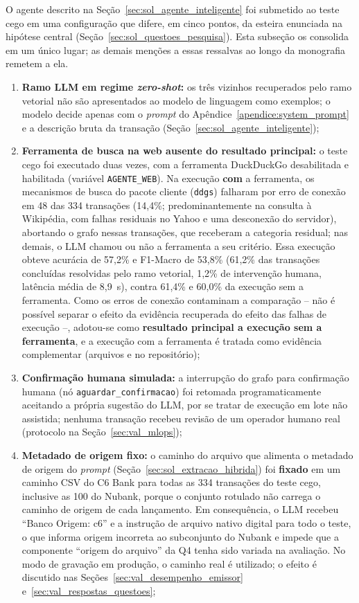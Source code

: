 O agente descrito na Seção~\ref{sec:sol_agente_inteligente} foi submetido ao teste cego em uma configuração que difere, em cinco pontos, da esteira enunciada na hipótese central (Seção~\ref{sec:sol_questoes_pesquisa}). Esta subseção os consolida em um único lugar; as demais menções a essas ressalvas ao longo da monografia remetem a ela.
\begin{enumerate}
	\item \textbf{Ramo LLM em regime \textit{zero-shot}:} os três vizinhos recuperados pelo ramo vetorial não são apresentados ao modelo de linguagem como exemplos; o modelo decide apenas com o \textit{prompt} do Apêndice~\ref{apendice:system_prompt} e a descrição bruta da transação (Seção~\ref{sec:sol_agente_inteligente});
	\item \textbf{Ferramenta de busca na web ausente do resultado principal:} o teste cego foi executado duas vezes, com a ferramenta DuckDuckGo desabilitada e habilitada (variável \texttt{AGENTE\_WEB}). Na execução \textbf{com} a ferramenta, os mecanismos de busca do pacote cliente (\texttt{ddgs}) falharam por erro de conexão em 48 das 334 transações (14,4\%; predominantemente na consulta à Wikipédia, com falhas residuais no Yahoo e uma desconexão do servidor), abortando o grafo nessas transações, que receberam a categoria residual; nas demais, o LLM chamou ou não a ferramenta a seu critério. Essa execução obteve acurácia de 57,2\% e F1-Macro de 53,8\% (61,2\% das transações concluídas resolvidas pelo ramo vetorial, 1,2\% de intervenção humana, latência média de 8,9~s), contra 61,4\% e 60,0\% da execução sem a ferramenta. Como os erros de conexão contaminam a comparação -- não é possível separar o efeito da evidência recuperada do efeito das falhas de execução --, adotou-se como \textbf{resultado principal a execução sem a ferramenta}, e a execução com a ferramenta é tratada como evidência complementar (arquivos  e  no repositório);
	\item \textbf{Confirmação humana simulada:} a interrupção do grafo para confirmação humana (nó \texttt{aguardar\_confirmacao}) foi retomada programaticamente aceitando a própria sugestão do LLM, por se tratar de execução em lote não assistida; nenhuma transação recebeu revisão de um operador humano real (protocolo na Seção~\ref{sec:val_mlops});
	\item \textbf{Metadado de origem fixo:} o caminho do arquivo que alimenta o metadado de origem do \textit{prompt} (Seção~\ref{sec:sol_extracao_hibrida}) foi \textbf{fixado} em um caminho CSV do C6 Bank para todas as 334 transações do teste cego, inclusive as 100 do Nubank, porque o conjunto rotulado não carrega o caminho de origem de cada lançamento. Em consequência, o LLM recebeu ``Banco Origem: c6'' e a instrução de arquivo nativo digital para todo o teste, o que informa origem incorreta ao subconjunto do Nubank e impede que a componente ``origem do arquivo'' da Q4 tenha sido variada na avaliação. No modo de gravação em produção, o caminho real é utilizado; o efeito é discutido nas Seções~\ref{sec:val_desempenho_emissor} e~\ref{sec:val_respostas_questoes};

\end{enumerate}
